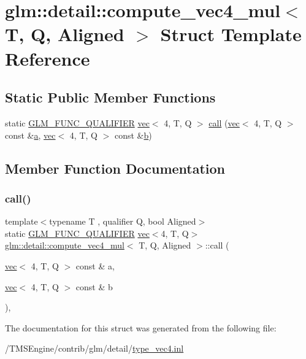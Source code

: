 \hypertarget{structglm_1_1detail_1_1compute__vec4__mul}{}\section{glm\+:\+:detail\+:\+:compute\+\_\+vec4\+\_\+mul$<$ T, Q, Aligned $>$ Struct Template Reference}
\label{structglm_1_1detail_1_1compute__vec4__mul}
\subsection*{Static Public Member Functions}
\begin{DoxyCompactItemize}
\item 
static \hyperlink{setup_8hpp_a33fdea6f91c5f834105f7415e2a64407}{G\+L\+M\+\_\+\+F\+U\+N\+C\+\_\+\+Q\+U\+A\+L\+I\+F\+I\+ER} \hyperlink{structglm_1_1vec}{vec}$<$ 4, T, Q $>$ \hyperlink{structglm_1_1detail_1_1compute__vec4__mul_a349917211c527b2f0c2dc552932fce5b}{call} (\hyperlink{structglm_1_1vec}{vec}$<$ 4, T, Q $>$ const \&\hyperlink{_s_d_l__opengl__glext_8h_a3309789fc188587d666cda5ece79cf82}{a}, \hyperlink{structglm_1_1vec}{vec}$<$ 4, T, Q $>$ const \&\hyperlink{_s_d_l__opengl__glext_8h_a0f71581a41fd2264c8944126dabbd010}{b})
\end{DoxyCompactItemize}


\subsection{Member Function Documentation}
\mbox{\label{structglm_1_1detail_1_1compute__vec4__mul_a349917211c527b2f0c2dc552932fce5b}} 
\subsubsection{\texorpdfstring{call()}{call()}}
{\footnotesize\ttfamily template$<$typename T , qualifier Q, bool Aligned$>$ \\
static \hyperlink{setup_8hpp_a33fdea6f91c5f834105f7415e2a64407}{G\+L\+M\+\_\+\+F\+U\+N\+C\+\_\+\+Q\+U\+A\+L\+I\+F\+I\+ER} \hyperlink{structglm_1_1vec}{vec}$<$4, T, Q$>$ \hyperlink{structglm_1_1detail_1_1compute__vec4__mul}{glm\+::detail\+::compute\+\_\+vec4\+\_\+mul}$<$ T, Q, Aligned $>$\+::call (\begin{DoxyParamCaption}\item[{\hyperlink{structglm_1_1vec}{vec}$<$ 4, T, Q $>$ const \&}]{a,  }\item[{\hyperlink{structglm_1_1vec}{vec}$<$ 4, T, Q $>$ const \&}]{b }\end{DoxyParamCaption})\hspace{0.3cm}{\ttfamily [inline]}, {\ttfamily [static]}}



The documentation for this struct was generated from the following file\+:\begin{DoxyCompactItemize}
\item 
/\+T\+M\+S\+Engine/contrib/glm/detail/\hyperlink{type__vec4_8inl}{type\+\_\+vec4.\+inl}\end{DoxyCompactItemize}

